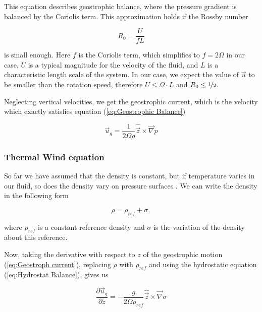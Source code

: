 \documentclass[12pt, a4paper]{article} %
\newcommand{\todoEnglish}{\todo[color=red!20]}
\begin{document}
		This equation describes geostrophic balance, where the pressure gradient is balanced by the Coriolis term. This approximation holds if the Rossby number 
		
		\begin{equation}
			R_0 = \frac{U}{f L}
			\label{eq:Rossby Number}
		\end{equation}
		
		is small enough. Here $f$ is the Coriolis term, which simplifies to $f=2\Omega$ in our case, $U$ is a typical magnitude for the velocity of the fluid, and $L$ is a characteristic length scale of the system. In our case, we expect the value of $\vec{u}$ to be smaller than the rotation speed, therefore $U \leq \Omega \cdot L$ and $R_0 \leq \nicefrac{1}{2}$.
		
		Neglecting vertical velocities, we get the geostrophic current, which is the velocity which exactly satisfies equation (\ref{eq:Geostrophic Balance})
		
		\begin{equation}
			\vec{u}_g = \frac{1}{2\Omega \rho} \hat{\vec{z}} \times \vec{\nabla}p
			\label{eq:Geostroph current}
		\end{equation}
		
		\subsubsection{Thermal Wind equation}
			So far we have assumed that the density is constant, but if temperature varies in our fluid, so does the density vary on pressure surfaces \todoEnglish{this doesn't sound good..}. We can write the density in the following form
			
			\begin{equation}
				\rho = \rho_{ref} + \sigma ,
				\label{eq:Density}
			\end{equation} 
		
		where $\rho_{ref}$ is a constant reference density and $\sigma$ is the variation of the density about this reference. %
		
		Now, taking the derivative with respect to $z$ of the geostrophic motion (\ref{eq:Geostroph current}), replacing $\rho$ with $\rho_{ref}$ and using the hydrostatic equation (\ref{eq:Hydrostat Balance}), gives us
		
		\begin{equation}
			\frac{\partial \vec{u}_g}{\partial z} = - \frac{g}{2\Omega \rho_{ref}} \hat{\vec{z}} \times \vec{\nabla} \sigma
		\end{equation}
		
\end{document}
